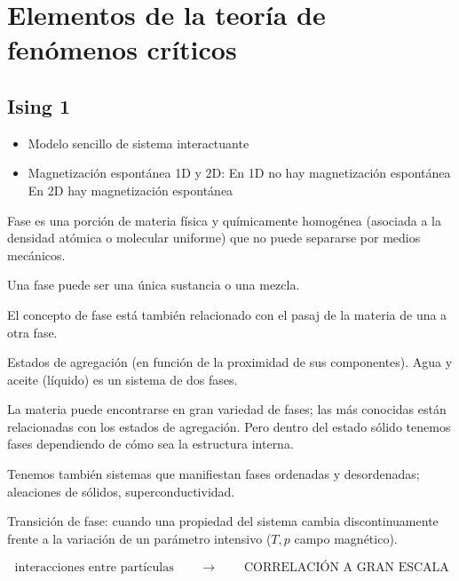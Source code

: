 \documentclass[10pt,oneside]{CBFT_book}
\begin{document}
\chapter{Elementos de la teoría de fenómenos críticos}


\section{Ising 1}

\begin{itemize}
 \item Modelo sencillo de sistema interactuante
 \item Magnetización espontánea 1D y 2D:
 \subitem En 1D no hay magnetización espontánea
 \subitem En 2D hay magnetización espontánea
\end{itemize}

Fase es una porción de materia física y químicamente homogénea (asociada a la densidad atómica o molecular
uniforme) que no puede separarse por medios mecánicos.

Una fase puede ser una única sustancia o una mezcla.

El concepto de fase está también relacionado con el pasaj de la materia de una a otra fase.


Estados de agregación (en función de la proximidad de sus componentes). Agua y aceite (líquido) es un sistema de dos 
fases.

La materia puede encontrarse en gran variedad de fases; las más conocidas están relacionadas con los estados de 
agregación. Pero dentro del estado sólido tenemos fases dependiendo de cómo sea la estructura interna.

Tenemos también sistemas que manifiestan fases ordenadas y desordenadas; aleaciones de sólidos, superconductividad.

Transición de fase: cuando una propiedad del sistema cambia discontinuamente frente a la variación de un parámetro 
intensivo ($T, p$ campo magnético).

\[
	\text{ interacciones entre partículas } \qquad \rightarrow \qquad \text{ CORRELACIÓN A GRAN ESCALA }  
\]
\end{document}
